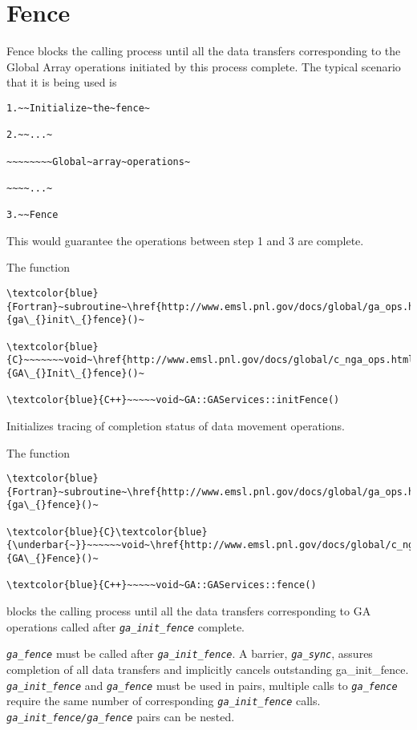 \section{Fence }

Fence blocks the calling process until all the data transfers corresponding
to the Global Array operations initiated by this process complete.
The typical scenario that it is being used is
\begin{verbatim}
1.~~Initialize~the~fence~

2.~~...~

~~~~~~~~Global~array~operations~

~~~~...~

3.~~Fence
\end{verbatim}
This would guarantee the operations between step 1 and 3 are complete.

The function
\begin{verbatim}
\textcolor{blue}{Fortran}~subroutine~\href{http://www.emsl.pnl.gov/docs/global/ga_ops.html\#ga_init_fence}{ga\_{}init\_{}fence}()~

\textcolor{blue}{C}~~~~~~~void~\href{http://www.emsl.pnl.gov/docs/global/c_nga_ops.html\#ga_init_fence}{GA\_{}Init\_{}fence}()~

\textcolor{blue}{C++}~~~~~void~GA::GAServices::initFence()
\end{verbatim}
Initializes tracing of completion status of data movement operations.

The function
\begin{verbatim}
\textcolor{blue}{Fortran}~subroutine~\href{http://www.emsl.pnl.gov/docs/global/ga_ops.html\#ga_fence}{ga\_{}fence}()~

\textcolor{blue}{C}\textcolor{blue}{\underbar{~}}~~~~~~void~\href{http://www.emsl.pnl.gov/docs/global/c_nga_ops.html\#ga_fence}{GA\_{}Fence}()~

\textcolor{blue}{C++}~~~~~void~GA::GAServices::fence()
\end{verbatim}
blocks the calling process until all the data transfers corresponding
to GA operations called after \texttt{\emph{ga\_init\_fence}} complete.

\texttt{\emph{ga\_fence}} must be called after \texttt{\emph{ga\_init\_fence}}.
A barrier, \texttt{\emph{ga\_sync}}, assures completion of all data
transfers and implicitly cancels outstanding ga\_init\_fence. \texttt{\emph{ga\_init\_fence}}
and \texttt{\emph{ga\_fence}} must be used in pairs, multiple calls
to \texttt{\emph{ga\_fence}} require the same number of corresponding
\texttt{\emph{ga\_init\_fence}} calls. \texttt{\emph{ga\_init\_fence/ga\_fence}}
pairs can be nested.

